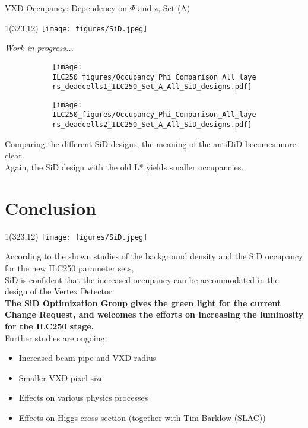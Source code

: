 \documentclass[xcolor={dvipsnames}]{beamer}
\newcommand{\sidlogo}{
  \setlength{\TPHorizModule}{1pt}
  \setlength{\TPVertModule}{1pt}
  \begin{textblock}{1}(323,12)
   \texttt{[image: figures/SiD.jpeg]}
  \end{textblock}
  }
\begin{document}
\begin{frame}{VXD Occupancy: Dependency on $\Phi$ and z, Set (A)}
\sidlogo
\flushright \textit{\small Work in progress...}
\begin{figure}
\centering
\begin{subfigure}[t]{0.48\textwidth}
\centering
\texttt{[image: ILC250\_figures/Occupancy\_Phi\_Comparison\_All\_layers\_deadcells1\_ILC250\_Set\_A\_All\_SiD\_designs.pdf]}
 \end{subfigure}
\hspace*{0.2cm}
\begin{subfigure}[t]{0.48\textwidth}
\centering
\texttt{[image: ILC250\_figures/Occupancy\_Phi\_Comparison\_All\_layers\_deadcells2\_ILC250\_Set\_A\_All\_SiD\_designs.pdf]}
\end{subfigure}
\end{figure}
\flushleft Comparing the different SiD designs, the meaning of the antiDiD becomes more clear.\\
Again, the SiD design with the old L* yields smaller occupancies.
\end{frame}

\section{Conclusion}
\begin{frame}
\sidlogo
\vspace*{0.5cm}
 According to the shown studies of the background density and the SiD occupancy for the new ILC250 parameter sets,\\
 \alert{SiD is confident that the increased occupancy can be accommodated in the design of the Vertex Detector.}\\
 \textbf{The SiD Optimization Group gives the green light for the current Change Request, and welcomes the efforts on increasing the luminosity for the ILC250 stage.}\\
 \vspace*{0.5cm}
 Further studies are ongoing:
 \begin{itemize}
  \item Increased beam pipe and VXD radius
  \item Smaller VXD pixel size
  \item Effects on various physics processes
  \item Effects on Higgs cross-section (together with Tim Barklow (SLAC))
 \end{itemize}

\end{frame}
\end{document}
